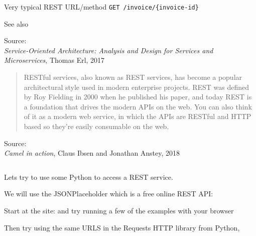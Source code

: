 \documentclass[Screen16to9,17pt]{foils}
\begin{document}



\begin{list2}
\item Very typical REST URL/method \verb+GET /invoice/{invoice-id}+
\item See also 
\end{list2}
Source: {\footnotesize\\
\emph{Service‑Oriented Architecture: Analysis and Design for Services and Microservices}, Thomas Erl, 2017}





\begin{quote}
  RESTful services, also known as REST services, has become a popular architectural style
  used in modern enterprise projects. REST was defined by Roy Fielding in 2000 when
  he published his paper, and today REST is a foundation that drives the modern APIs
  on the web. You can also think of it as a modern web service, in which the APIs are
  RESTful and HTTP based so they’re easily consumable on the web.
\end{quote}

Source: {\footnotesize\\
\emph{Camel in action}, Claus Ibsen and Jonathan Anstey, 2018}


\inputminted{python}{programs/rest-1.py}

\begin{list2}
\item  Lets try to use some Python to access a REST service.
\item  We will use the JSONPlaceholder which is a free online REST API:
\item Start at the site:  and try running a few of the examples with your browser
\item Then try using the same URLS in the Requests HTTP library from Python,\\
\end{list2}

\end{document}
